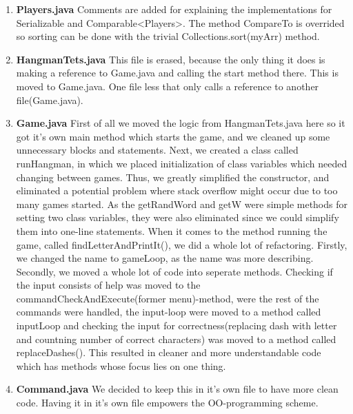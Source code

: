 \documentclass{article}
\begin{document}
\begin{enumerate}
	\item
	\textbf{Players.java}
	Comments are added for explaining the implementations for Serializable and Comparable<Players>.
	The method CompareTo is overrided so sorting can be done with the trivial Collections.sort(myArr) method.
	\item
	\textbf{HangmanTets.java}
	This file is erased, because the only thing it does is making a reference to Game.java and calling the start method there. This is moved to Game.java. One file less that only calls a reference to another file(Game.java).
	\item
	\textbf{Game.java}
	First of all we moved the logic from HangmanTets.java here so it got it's own main method which starts the game, and we cleaned up some unnecessary blocks and statements. Next, we
	created a class called runHangman, in which we placed initialization of class variables
	which needed changing between games. Thus, we greatly simplified the constructor, and
	eliminated a potential problem where stack overflow might occur due to too many games
	started. As the getRandWord and getW were simple methods for setting two class variables, they were also eliminated since we could simplify them into one-line statements. When it comes to the method running the game, called findLetterAndPrintIt(),
	we did a whole lot of refactoring. Firstly, we changed the name to gameLoop, as the name
	was more describing. Secondly, we moved a whole lot of code into seperate methods. Checking
	if the input consists of help was moved to the commandCheckAndExecute(former menu)-method, 
	were the rest of the commands were handled, the input-loop were moved to a method called
	inputLoop and checking the input for correctness(replacing dash with letter and countning 
	number of correct characters) was moved to a method called 
	replaceDashes(). This resulted in cleaner and more understandable code which has methods
	whose focus lies on one thing.

	\item%
	\textbf{Command.java}
	We decided to keep this in it's own file to have more clean code. Having it in it's own file empowers the OO-programming scheme.

\end{enumerate}
\end{document}
